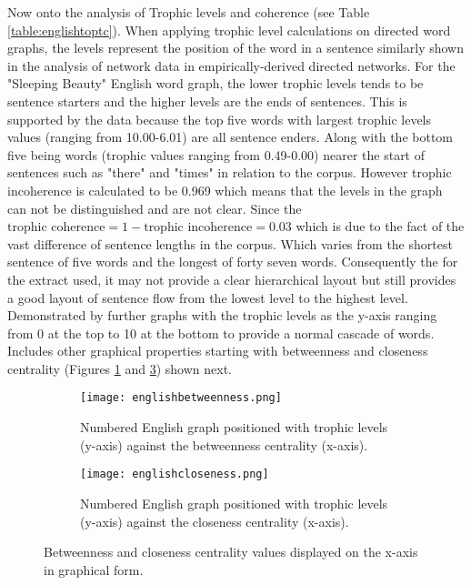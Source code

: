 Now onto the analysis of Trophic levels and coherence (see Table \ref{table:englishtoptc}). When applying trophic level calculations on directed word graphs, the levels represent the position of the word in a sentence similarly shown in the analysis of network data in empirically-derived directed networks\cite{johnson2017looplessness}. For the "Sleeping Beauty" English word graph, the lower trophic levels tends to be sentence starters and the higher levels are the ends of sentences. This is supported by the data because the top five words with largest trophic levels values (ranging from 10.00-6.01) are all sentence enders. Along with the bottom five being words (trophic values ranging from 0.49-0.00) nearer the start of sentences such as "there" and "times" in relation to the corpus. However trophic incoherence is calculated to be 0.969 which means that the levels in the graph can not be distinguished and are not clear. Since the $\text{trophic coherence} = 1 - \text{trophic incoherence} = 0.03$ which is due to the fact of the vast difference of sentence lengths in the corpus. Which varies from the shortest sentence of five words and the longest of forty seven words. Consequently the for the extract used, it may not provide a clear hierarchical layout but still provides a good layout of sentence flow from the lowest level to the highest level. Demonstrated by further graphs with the trophic levels as the y-axis ranging from 0 at the top to 10 at the bottom to provide a normal cascade of words. Includes other graphical properties starting with betweenness and closeness centrality (Figures \ref{fig:engbc} and \ref{fig:engcc}) shown next.

\begin{figure}[H]
\centering
\begin{subfigure}{.45\textwidth}
	\hspace{-1cm} 
	\texttt{[image: englishbetweenness.png]}
	\caption{Numbered English graph positioned with trophic levels (y-axis) against the betweenness centrality (x-axis).}
	\label{fig:engbc}
\end{subfigure}
\hfill
\begin{subfigure}{.45\textwidth}
	\hspace{-1cm} 
	\texttt{[image: englishcloseness.png]}
	\caption{Numbered English graph positioned with trophic levels (y-axis) against the closeness centrality (x-axis).}
	\label{fig:engcc}
\end{subfigure}
\caption{Betweenness and closeness centrality values displayed on the x-axis in graphical form.}
\end{figure}

